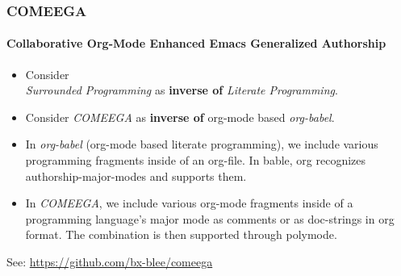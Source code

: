 \begin{whenOrg}
\begin{verblatex}

\begin{frame}[fragile,plain,label=comeega]
    \frametitle{COMEEGA}
    \framesubtitle{Collaborative Org-Mode Enhanced Emacs Generalized Authorship}

    \begin{itemize}

      \item Consider\\ \colorbox{blue!30}{\textit{Surrounded Programming}} as \textbf{inverse of} \colorbox{blue!60}{\color{white}\textit{Literate Programming}}.


      \item Consider \colorbox{blue!30}{\textit{COMEEGA}} as \textbf{inverse of} org-mode based \colorbox{blue!60}{\color{white}\textit{org-babel}}.

      \item In \colorbox{blue!60}{\color{white}\textit{org-babel}} (org-mode based literate programming), we include various programming
   fragments inside of an org-file. In bable, org recognizes authorship-major-modes and
   supports them.

      \item In \colorbox{blue!30}{\textit{COMEEGA}}, we include various org-mode fragments
            inside of a programming language’s major mode as comments or as doc-strings in
            org format. The combination is then supported through polymode.

    \end{itemize}

    See: \url{https://github.com/bx-blee/comeega}
    

\end{frame}
\end{verblatex}
\end{whenOrg}
